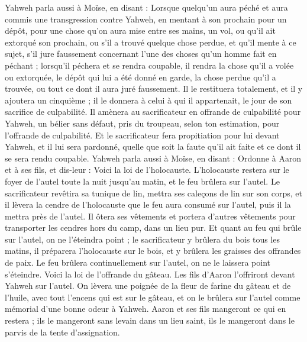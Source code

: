 \begin{multicols}{2}
Yahweh parla aussi à Moïse, en disant :
Lorsque quelqu’un aura péché et aura commis une transgression contre Yahweh, en mentant à son prochain pour un dépôt, pour une chose qu'on aura mise entre ses mains, un vol, ou qu'il ait extorqué son prochain,
ou s'il a trouvé quelque chose perdue, et qu'il mente à ce sujet, s'il jure faussement concernant l’une des choses qu'un homme fait en péchant ;
lorsqu’il péchera et se rendra coupable, il rendra la chose qu'il a volée ou extorquée, le dépôt qui lui a été donné en garde, la chose perdue qu'il a trouvée,
ou tout ce dont il aura juré faussement. Il le restituera totalement, et il y ajoutera un cinquième ; il le donnera à celui à qui il appartenait, le jour de son sacrifice de culpabilité.
Il amènera au sacrificateur en offrande de culpabilité pour Yahweh, un bélier sans défaut, pris du troupeau, selon ton estimation, pour l’offrande de culpabilité.
Et le sacrificateur fera propitiation pour lui devant Yahweh, et il lui sera pardonné, quelle que soit la faute qu’il ait faite et ce dont il se sera rendu coupable.
\VerseOne{}Yahweh parla aussi à Moïse, en disant :
Ordonne à Aaron et à ses fils, et dis-leur : Voici la loi de l'holocauste. L'holocauste restera sur le foyer de l'autel toute la nuit jusqu'au matin, et le feu brûlera sur l'autel.
Le sacrificateur revêtira sa tunique de lin, mettra ses caleçons de lin sur son corps, et il lèvera la cendre de l’holocauste que le feu aura consumé sur l'autel, puis il la mettra près de l'autel.
Il ôtera ses vêtements et portera d'autres vêtements pour transporter les cendres hors du camp, dans un lieu pur.
Et quant au feu qui brûle sur l'autel, on ne l'éteindra point ; le sacrificateur y brûlera du bois tous les matins, il préparera l'holocauste sur le bois, et y brûlera les graisses des offrandes de paix.
Le feu brûlera continuellement sur l'autel, on ne le laissera point s’éteindre.
Voici la loi de l'offrande du gâteau. Les fils d'Aaron l'offriront devant Yahweh sur l'autel.
On lèvera une poignée de la fleur de farine du gâteau et de l’huile, avec tout l'encens qui est sur le gâteau, et on le brûlera sur l'autel comme mémorial d’une bonne odeur à Yahweh.
Aaron et ses fils mangeront ce qui en restera ; ils le mangeront sans levain dans un lieu saint, ils le mangeront dans le parvis de la tente d'assignation.

\end{multicols}

